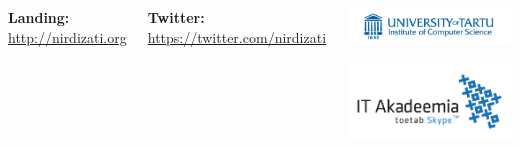 \documentclass[24pt, a0paper, landscape]{tikzposter}
\begin{document}
\begin{columns}
{        \bigbreak
        \textbf{Landing:} \href{http://nirdizati.org/}{\url{http://nirdizati.org}}
        
        \bigbreak

        \textbf{Twitter:} \href{https://twitter.com/nirdizati}{\url{https://twitter.com/nirdizati}}
        }

        \block{}
        {

        \begin{multicols}{2}
            \begin{tikzfigure}
                \includegraphics[scale=0.8]{figures/unilogo.jpg}
            \end{tikzfigure}

            \columnbreak

            \begin{tikzfigure}
                \includegraphics[scale=0.5]{figures/IT-Akadeemia-logo.jpg}
            \end{tikzfigure}
        
        
	        \end{multicols}

        }

    \end{columns}
\end{document}
